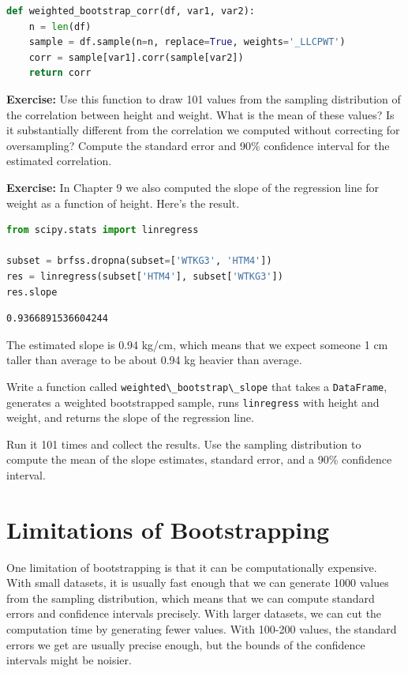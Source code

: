 \begin{lstlisting}[language=Python,style=source]
def weighted_bootstrap_corr(df, var1, var2):
    n = len(df)
    sample = df.sample(n=n, replace=True, weights='_LLCPWT')
    corr = sample[var1].corr(sample[var2])
    return corr
\end{lstlisting}

\textbf{Exercise:} Use this function to draw 101 values from the
sampling distribution of the correlation between height and weight. What
is the mean of these values? Is it substantially different from the
correlation we computed without correcting for oversampling? Compute the
standard error and 90\% confidence interval for the estimated
correlation.

\textbf{Exercise:} In Chapter 9 we also computed the slope of the
regression line for weight as a function of height. Here's the result.

\begin{lstlisting}[language=Python,style=source]
from scipy.stats import linregress

subset = brfss.dropna(subset=['WTKG3', 'HTM4'])
res = linregress(subset['HTM4'], subset['WTKG3'])
res.slope
\end{lstlisting}

\begin{lstlisting}[style=output]
0.9366891536604244
\end{lstlisting}

The estimated slope is 0.94 kg/cm, which means that we expect someone 1
cm taller than average to be about 0.94 kg heavier than average.

Write a function called
\passthrough{\lstinline!weighted\_bootstrap\_slope!} that takes a
\passthrough{\lstinline!DataFrame!}, generates a weighted bootstrapped
sample, runs \passthrough{\lstinline!linregress!} with height and
weight, and returns the slope of the regression line.

Run it 101 times and collect the results. Use the sampling distribution
to compute the mean of the slope estimates, standard error, and a 90\%
confidence interval.

\hypertarget{limitations-of-bootstrapping}{%
\section{Limitations of
Bootstrapping}\label{limitations-of-bootstrapping}}

One limitation of bootstrapping is that it can be computationally
expensive. With small datasets, it is usually fast enough that we can
generate 1000 values from the sampling distribution, which means that we
can compute standard errors and confidence intervals precisely. With
larger datasets, we can cut the computation time by generating fewer
values. With 100-200 values, the standard errors we get are usually
precise enough, but the bounds of the confidence intervals might be
noisier.

